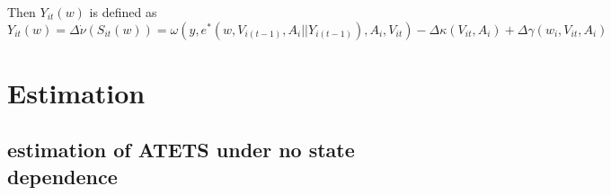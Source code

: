 \documentclass{article}
\begin{document}
Then $Y_{it}(w)$ is defined as 
\begin{equation}
    Y_{it}(w) = \Delta \dot{\nu}( S_{it}(w)) = \omega ( y, e^*( w, V_{i(t-1)}, A_i || Y_{i(t-1)}), A_i, V_{it} ) - \Delta \kappa ( V_{it}, A_i) + \Delta \gamma(w_i,V_{it}, A_i)
\end{equation}




\section{Estimation}
 


\subsection{estimation of ATETS under no state dependence}
\end{document}
